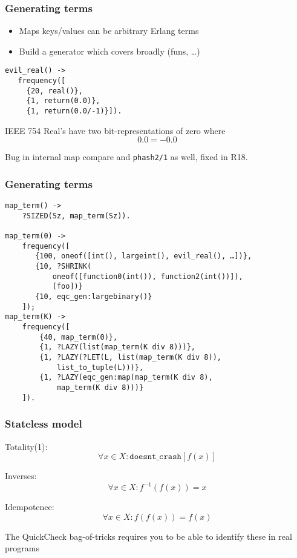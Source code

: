 \documentclass[lualatex]{beamer}
\begin{document}
\begin{frame}[fragile]
\frametitle{Generating terms}
\begin{itemize}
\item Maps keys/values can be arbitrary Erlang terms
\item Build a generator which covers broadly (funs, …)
\end{itemize}

\begin{verbatim}
evil_real() ->
   frequency([
     {20, real()},
     {1, return(0.0)},
     {1, return(0.0/-1)}]).
\end{verbatim}

IEEE 754 Real's have two bit-representations of zero where
$$
	0.0 = -0.0
$$

Bug in internal map compare and \texttt{phash2/1} as well, fixed in R18.
\end{frame}

\begin{frame}[fragile]
\frametitle{Generating terms}
\begin{Verbatim}[fontsize=\small]
map_term() ->
    ?SIZED(Sz, map_term(Sz)).

map_term(0) ->
    frequency([
       {100, oneof([int(), largeint(), evil_real(), …])},
       {10, ?SHRINK(
           oneof([function0(int()), function2(int())]),
           [foo])}
       {10, eqc_gen:largebinary()}
    ]);
map_term(K) ->
    frequency([
        {40, map_term(0)},
        {1, ?LAZY(list(map_term(K div 8)))},
        {1, ?LAZY(?LET(L, list(map_term(K div 8)),
            list_to_tuple(L)))},
        {1, ?LAZY(eqc_gen:map(map_term(K div 8),
            map_term(K div 8)))}
    ]).
\end{Verbatim}
\end{frame}

\begin{frame}[fragile]
\frametitle{Stateless model}

Totality(1):
\begin{equation}
	\forall x \in X : \texttt{doesnt\_crash}[f(x)]
\end{equation}

Inverses:
\begin{equation}
	\forall x \in X : f^{-1}(f(x)) = x
\end{equation}

Idempotence:
\begin{equation}
	\forall x \in X : f(f(x)) = f(x)
\end{equation}

The QuickCheck bag-of-tricks requires you to be able to identify these in real programs
\end{frame}
\end{document}
